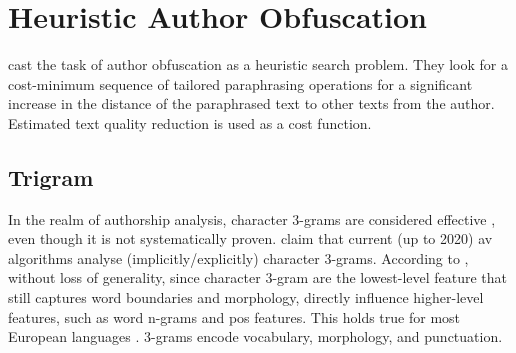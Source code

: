 \section{Heuristic Author Obfuscation}
\label{sec:heuristic_author_obfuscation}

\citet{bevendorff_divergence_based_2020} cast the task of author obfuscation as a heuristic search problem.
They look for a cost-minimum sequence of tailored paraphrasing operations for a significant increase in the distance 
of the paraphrased text to other texts from the author.
Estimated text quality reduction is used as a cost function.

\subsection{Trigram}
In the realm of authorship analysis, character 3-grams are considered effective \cite{bevendorff_divergence_based_2020}, 
even though it is not systematically proven.
\citet{bevendorff_divergence_based_2020} claim that current (up to 2020) \ac{av} algorithms analyse (implicitly/explicitly) 
character 3-grams.
According to \citet{bevendorff_divergence_based_2020}, without loss of generality, since character 3-gram are the lowest-level feature that 
still captures word boundaries and morphology, %
directly influence higher-level features, such as word n-grams and \ac{pos} features.
This holds true for most European languages \cite{bevendorff_divergence_based_2020}.
3-grams encode vocabulary, morphology, and punctuation.

